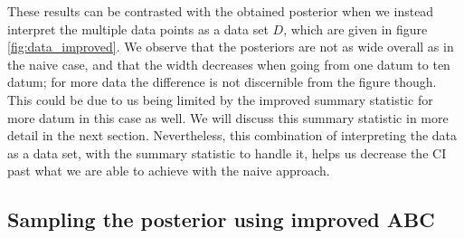 \documentclass[11pt,a4paper]{article}
\begin{document}
These results can be contrasted with the obtained posterior when we instead interpret the multiple data points as a data set $D$, which are given in figure \ref{fig:data_improved}. We observe that the posteriors are not as wide overall as in the naive case, and that the width decreases when going from one datum to ten datum; for more data the difference is not discernible from the figure though. This could be due to us being limited by the improved summary statistic for more datum in this case as well. We will discuss this summary statistic in more detail in the next section. Nevertheless, this combination of interpreting the data as a data set, with the summary statistic to handle it, helps us decrease the CI past what we are able to achieve with the naive approach.



\subsection{Sampling the posterior using improved ABC}

\end{document}
